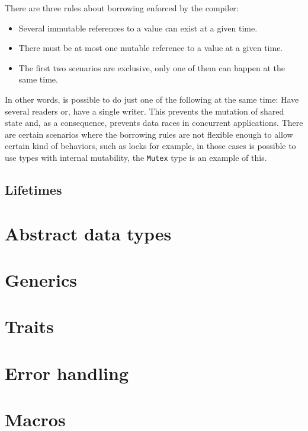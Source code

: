 There are three rules about borrowing enforced by the compiler:
\begin{itemize}
    \item Several immutable references to a value can exist at a given time.
    \item There must be at most one mutable reference to a value at a given time.
    \item The first two scenarios are exclusive, only one of them can happen at the same time.
\end{itemize}
In other words, is possible to do just one of the following at the same time: Have several readers or, have a single writer. This prevents the mutation of shared state and, as a consequence, prevents data races in concurrent applications. There are certain scenarios where the borrowing rules are not flexible enough to allow certain kind of behaviors, such as locks for example, in those cases is possible to use types with internal mutability, the \texttt{Mutex} type is an example of this.

\subsection{Lifetimes}
\section{Abstract data types}
\section{Generics}
\section{Traits}
\section{Error handling}
\section{Macros}
